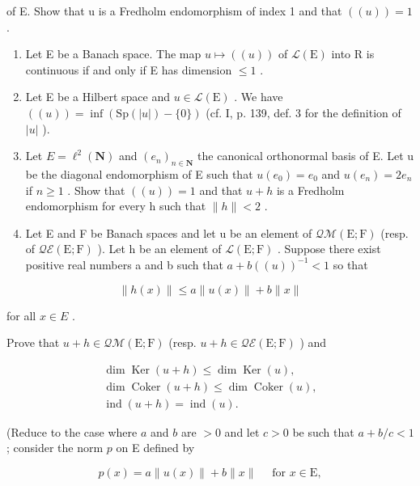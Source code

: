 of E. Show that u is a Fredholm endomorphism of index 1 and that \(((u)) = 1\) .

\begin{enumerate}
\def\labelenumi{\arabic{enumi})}
\setcounter{enumi}{3}
\item
  Let E be a Banach space. The map \(u \mapsto ((u))\) of \(\mathcal{L}(\mathrm{E})\) into R is continuous if and only if E has dimension \(\leqslant 1\) .
\item
  Let E be a Hilbert space and \(u \in \mathcal{L}(\mathrm{E})\) . We have \(((u)) = \inf(\mathrm{Sp}(|u|) - \{0\})\) (cf. I, p. 139, def. 3 for the definition of \(|u|\) ).
\item
  Let \(E = \ell^{2}(\mathbf{N})\) and \((e_{n})_{n \in \mathbf{N}}\) the canonical orthonormal basis of E. Let u be the diagonal endomorphism of E such that \(u(e_{0}) = e_{0}\) and \(u(e_{n}) = 2e_{n}\) if \(n \geqslant 1\) . Show that \(((u)) = 1\) and that \(u + h\) is a Fredholm endomorphism for every h such that \(\|h\| < 2\) .
\item
  Let E and F be Banach spaces and let u be an element of \(\mathcal{Q}\mathcal{M}(\mathrm{E};\mathrm{F})\) (resp. of \(\mathcal{Q}\mathcal{E}(\mathrm{E};\mathrm{F})\) ). Let h be an element of \(\mathcal{L}(\mathrm{E};\mathrm{F})\) . Suppose there exist positive real numbers a and b such that \(a + b((u))^{-1} < 1\) so that
\end{enumerate}

\[
\| h (x) \| \leqslant a \| u (x) \| + b \| x \|\tag{2}
\]

for all \(x \in E\) .

Prove that \(u + h \in \mathcal{Q}\mathcal{M}(\mathrm{E};\mathrm{F})\) (resp. \(u + h \in \mathcal{Q}\mathcal{E}(\mathrm{E};\mathrm{F})\) ) and

\[
\begin{array}{c} \dim \operatorname{Ker} (u + h) \leqslant \dim \operatorname{Ker} (u), \\ \dim \operatorname{Coker} (u + h) \leqslant \dim \operatorname{Coker} (u), \\ \operatorname{ind} (u + h) = \operatorname{ind} (u). \end{array}
\]

(Reduce to the case where \(a\) and \(b\) are \(>0\) and let \(c > 0\) be such that \(a + b/c < 1\) ; consider the norm \(p\) on E defined by

\[
p (x) = a \| u (x) \| + b \| x \| \quad \text {   for   } x \in \mathrm{E},
\]

